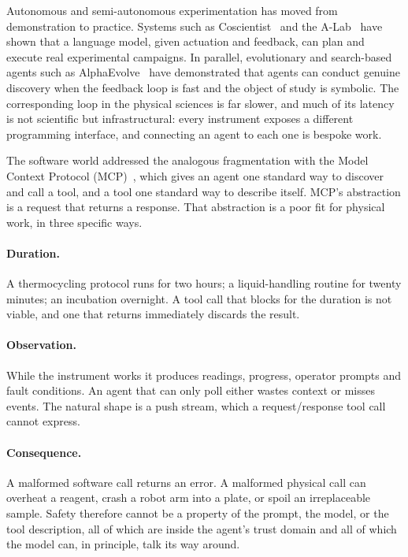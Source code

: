 \documentclass[11pt]{article}
\begin{document}
Autonomous and semi-autonomous experimentation has moved from demonstration to practice.
Systems such as Coscientist~\cite{boiko2023} and the A-Lab~\cite{szymanski2023} have shown
that a language model, given actuation and feedback, can plan and execute real experimental
campaigns. In parallel, evolutionary and search-based agents such as
AlphaEvolve~\cite{alphaevolve2025} have demonstrated that agents can conduct genuine
discovery when the feedback loop is fast and the object of study is symbolic. The
corresponding loop in the physical sciences is far slower, and much of its latency is not
scientific but infrastructural: every instrument exposes a different programming interface,
and connecting an agent to each one is bespoke work.

The software world addressed the analogous fragmentation with the Model Context Protocol
(MCP)~\cite{mcp2024}, which gives an agent one standard way to discover and call a tool, and
a tool one standard way to describe itself. MCP's abstraction is a request that returns a
response. That abstraction is a poor fit for physical work, in three specific ways.

\paragraph{Duration.} A thermocycling protocol runs for two hours; a liquid-handling routine
for twenty minutes; an incubation overnight. A tool call that blocks for the duration is not
viable, and one that returns immediately discards the result.

\paragraph{Observation.} While the instrument works it produces readings, progress, operator
prompts and fault conditions. An agent that can only poll either wastes context or misses
events. The natural shape is a push stream, which a request/response tool call cannot express.

\paragraph{Consequence.} A malformed software call returns an error. A malformed physical
call can overheat a reagent, crash a robot arm into a plate, or spoil an irreplaceable sample.
Safety therefore cannot be a property of the prompt, the model, or the tool description, all
of which are inside the agent's trust domain and all of which the model can, in principle,
talk its way around.
\end{document}
